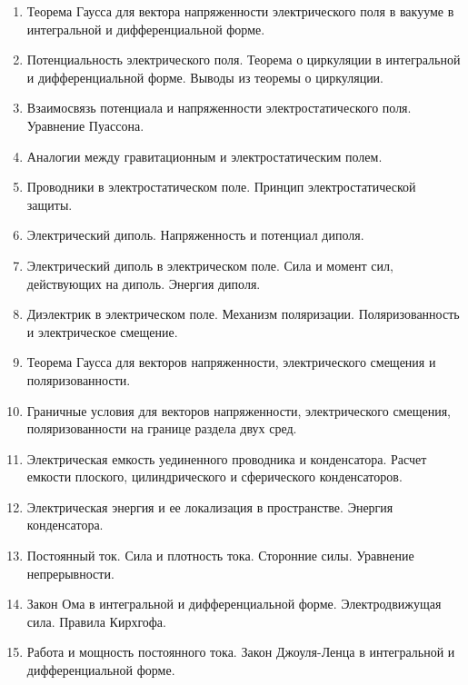 \documentclass[12pt]{article}
\begin{document}
\begin{enumerate}
        \item Теорема Гаусса для вектора напряженности электрического поля в вакууме в 
        интегральной и дифференциальной форме.  
        \item Потенциальность электрического поля. Теорема о циркуляции в интегральной и 
        дифференциальной форме. Выводы из теоремы о циркуляции. 
        \item Взаимосвязь потенциала и напряженности электростатического поля. Уравнение 
        Пуассона.  
        \item Аналогии между гравитационным и электростатическим полем.  
        \item Проводники в электростатическом поле. Принцип электростатической защиты.  
        \item Электрический диполь. Напряженность и потенциал диполя. 
        \item Электрический диполь в электрическом поле. Сила и момент сил, действующих на 
        диполь. Энергия диполя. 
        \item Диэлектрик в электрическом поле. Механизм поляризации. Поляризованность и 
        электрическое смещение. 
        \item Теорема Гаусса для векторов напряженности, электрического смещения и 
        поляризованности.  
        \item Граничные условия для векторов напряженности, электрического смещения, 
        поляризованности на границе раздела двух сред.   
        \item Электрическая емкость уединенного проводника и конденсатора. Расчет емкости 
        плоского, цилиндрического и сферического конденсаторов. 
        \item Электрическая энергия и ее локализация в пространстве. Энергия конденсатора.   
        \item Постоянный ток. Сила и плотность тока. Сторонние силы. Уравнение непрерывности. 
        \item Закон Ома в интегральной и дифференциальной форме. Электродвижущая сила. Правила 
        Кирхгофа. 
        \item Работа и мощность постоянного тока. Закон Джоуля-Ленца в интегральной и 
        дифференциальной форме.
    \end{enumerate}

\end{document}
